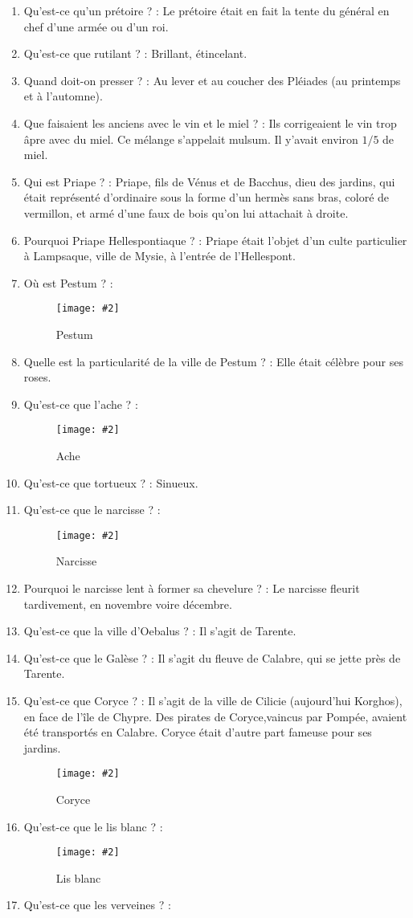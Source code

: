 \documentclass[a4paper, 11pt, hidelinks]{article}
\newcommand{\img}[4]{\begin{figure}[!ht]
    \centering
    \texttt{[image: \#2]}
    \caption{#3}
    \label{#4}
    \end{figure} }
\begin{document}
\begin{enumerate}
      \item Qu'est-ce qu'un prétoire ? : Le prétoire était en fait la tente du général en chef d'une armée ou d'un roi.
      \item Qu'est-ce que rutilant ? : Brillant, étincelant.
      \item Quand doit-on presser ? : Au lever et au coucher des Pléiades (au printemps et à l'automne).
      \item Que faisaient les anciens avec le vin et le miel ? : Ils corrigeaient le vin trop âpre avec du miel. Ce mélange s'appelait mulsum. Il y'avait environ $1/5$ de miel.
      \item Qui est Priape ? : Priape, fils de Vénus et de Bacchus, dieu des jardins, qui était représenté d'ordinaire sous la forme d'un hermès sans bras, coloré de vermillon, et armé d'une faux de bois qu'on lui attachait à droite.
      \item Pourquoi Priape Hellespontiaque ? : Priape était l'objet d'un culte particulier à Lampsaque, ville de Mysie, à l'entrée de l'Hellespont.
      \item Où est Pestum ? :
            \img{0.27}{Pestum.png}{Pestum}{135}
      \item Quelle est la particularité de la ville de Pestum ? : Elle était célèbre pour ses roses.
      \item Qu'est-ce que l'ache ? : 
            \img{0.03}{Ache.jpg}{Ache}{136}
      \item Qu'est-ce que tortueux ? : Sinueux.
      \item Qu'est-ce que le narcisse ? :
            \img{0.5}{Narcisse.jpg}{Narcisse}{137}
      \item Pourquoi le narcisse lent à former sa chevelure ? : Le narcisse fleurit tardivement, en novembre voire décembre.
      \item Qu'est-ce que la ville d'Oebalus ? : Il s'agit de Tarente.
      \item Qu'est-ce que le Galèse ? : Il s'agit du fleuve de Calabre, qui se jette près de Tarente.
      \item Qu'est-ce que Coryce ? : Il s'agit de la ville de Cilicie (aujourd'hui Korghos), en face de l'île de Chypre. Des pirates de Coryce,vaincus par Pompée, avaient été transportés en Calabre. Coryce était d'autre part fameuse pour ses jardins.
            \img{0.4}{Coryce.png}{Coryce}{138}
      \item Qu'est-ce que le lis blanc ? : 
            \img{0.5}{Lis.jpg}{Lis blanc}{139}
            \newpage
      \item Qu'est-ce que les verveines ? : 

\end{enumerate}
\end{document}
